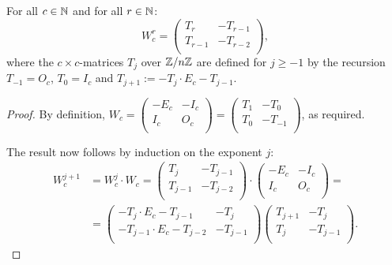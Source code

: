 \begin{lemma}\label{lem_struc}
  For all $c\in\mathbb{N}$ and for all $r\in\mathbb{N}$:
  \[
  W_{c}^{r}
  =
  \left(
  \begin{matrix}
     T_{r} &  -T_{r-1} \\
    T_{r-1} & -T_{r-2}   \\
  \end{matrix}
  \right),
  \]
  where the $c\times c$-matrices $T_j$ over $\mathbb{Z}/n\mathbb{Z}$ are defined for
$j\geq -1$ by the recursion $T_{-1}=O_c$, $T_0=I_c$ and $T_{j+1} := -T_j\cdot E_c - T_{j-1}.$
\end{lemma}

\begin{proof}
By definition,
$W_{c}= \left(\begin{smallmatrix} -E_c & -I_c \\ I_c & O_c \\\end{smallmatrix}\right) = \left(\begin{smallmatrix} T_{1} & -T_{0} \\ T_{0} & -T_{-1} \\\end{smallmatrix}\right)$, as required.

The result now follows by induction on the exponent $j$:
  \[
  \begin{aligned}
  W_{c}^{j+1}
  & = W_{c}^j \cdot W_{c} 
  =
  \left(
  \begin{matrix}
     T_{j} &  -T_{j-1}  \\
    T_{j-1} & -T_{j-2} \\
  \end{matrix}
  \right)
  \cdot
  \left(
  \begin{matrix}
    -E_c & -I_c \\
    I_c & O_c \\
  \end{matrix}
  \right)= \\
  & =
  \left(
  \begin{matrix}
    -T_j \cdot E_c - T_{j-1} & -T_{j}   \\
-T_{j-1}\cdot E_c - T_{j-2}  & -T_{j-1} \\
  \end{matrix}
  \right) 
  \left(
  \begin{matrix}
     T_{j+1} &  -T_{j} \\
    T_{j} & -T_{j-1} \\
  \end{matrix}
  \right).
  \end{aligned}
  \]
\end{proof}
%

